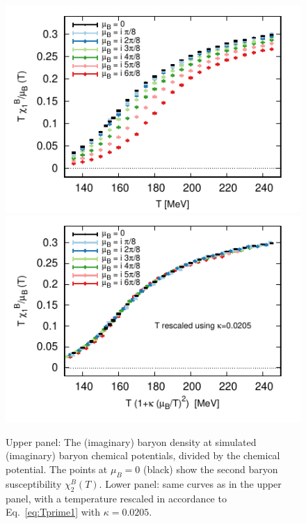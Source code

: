 \documentclass[aps,prd,twocolumn,superscriptaddress]{revtex4-2}
\begin{document}
\begin{figure}[h]
\includegraphics[width=\linewidth]{figures/shift_48x12_B2.pdf}
\includegraphics[width=\linewidth]{figures/shift_48x12_B2_collapse.pdf}
\caption{Upper panel: The (imaginary) baryon density at simulated 
(imaginary) baryon chemical potentials, divided by the 
chemical potential. The points at $\mu_B=0$ (black)
show the second baryon susceptibility $\chi_2^B(T)$. Lower panel: same
curves as in the upper panel, with a temperature rescaled in accordance to
Eq.~\eqref{eq:Tprime1} with $\kappa=0.0205$.}
\label{fig:shift_B2}
\end{figure}
\end{document}
